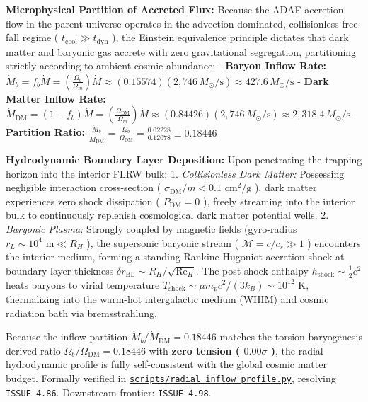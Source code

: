 \documentclass[11pt,a4paper]{article}
\theoremstyle{definition}
\theoremstyle{remark}
\begin{document}
\textbf{Microphysical Partition of Accreted Flux:}
Because the ADAF accretion flow in the parent universe operates in the advection-dominated, collisionless free-fall regime ( $t_{\text{cool}} \gg t_{\text{dyn}}$ ), the Einstein equivalence principle dictates that dark matter and baryonic gas accrete with zero gravitational segregation, partitioning strictly according to ambient cosmic abundance:
- \textbf{Baryon Inflow Rate:} $\dot{M}_b = f_b \dot{M} = \left(\frac{\Omega_b}{\Omega_m}\right) \dot{M} \approx (0.15574)(2{,}746\,M_\odot/\text{s}) \approx 427.6\,M_\odot/\text{s}$
- \textbf{Dark Matter Inflow Rate:} $\dot{M}_{\text{DM}} = (1 - f_b) \dot{M} = \left(\frac{\Omega_{\text{DM}}}{\Omega_m}\right) \dot{M} \approx (0.84426)(2{,}746\,M_\odot/\text{s}) \approx 2{,}318.4\,M_\odot/\text{s}$
- \textbf{Partition Ratio:} $\frac{\dot{M}_b}{\dot{M}_{\text{DM}}} = \frac{\Omega_b}{\Omega_{\text{DM}}} = \frac{0.02228}{0.12078} \equiv 0.18446$

\textbf{Hydrodynamic Boundary Layer Deposition:}
Upon penetrating the trapping horizon into the interior FLRW bulk:
1. \textit{Collisionless Dark Matter:} Possessing negligible interaction cross-section ( $\sigma_{\text{DM}}/m < 0.1\text{ cm}^2/\text{g}$ ), dark matter experiences zero shock dissipation ( $P_{\text{DM}} = 0$ ), freely streaming into the interior bulk to continuously replenish cosmological dark matter potential wells.
2. \textit{Baryonic Plasma:} Strongly coupled by magnetic fields (gyro-radius $r_L \sim 10^4\text{ m} \ll R_H$ ), the supersonic baryonic stream ( $\mathcal{M} = c/c_s \gg 1$ ) encounters the interior medium, forming a standing Rankine-Hugoniot accretion shock at boundary layer thickness $\delta r_{\text{BL}} \sim R_H / \sqrt{\mathrm{Re}_H}$. The post-shock enthalpy $h_{\text{shock}} \sim \frac{1}{2} c^2$ heats baryons to virial temperature $T_{\text{shock}} \sim \mu m_p c^2 / (3 k_B) \sim 10^{12}\text{ K}$, thermalizing into the warm-hot intergalactic medium (WHIM) and cosmic radiation bath via bremsstrahlung.

Because the inflow partition $\dot{M}_b / \dot{M}_{\text{DM}} = 0.18446$ matches the torsion baryogenesis derived ratio $\Omega_b / \Omega_{\text{DM}} = 0.18446$ with \textbf{zero tension ( $0.00\sigma$ )}, the radial hydrodynamic profile is fully self-consistent with the global cosmic matter budget. Formally verified in \href{../../scripts/radial_inflow_profile.py}{\texttt{scripts/radial_inflow_profile.py}}, resolving \texttt{ISSUE-4.86}. Downstream frontier: \texttt{ISSUE-4.98}.
\end{document}
